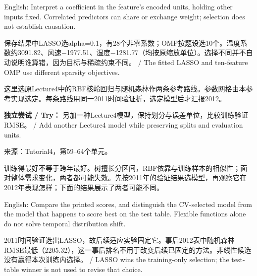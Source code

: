 English: Interpret a coefficient in the feature's encoded units, holding other inputs fixed. Correlated predictors can share or exchange weight; selection does not establish causation.


保存结果中LASSO选alpha=0.1，有28个非零系数；OMP按题设选10个。温度系数约3091.82、风速\ensuremath{-}1977.51、湿度\ensuremath{-}1281.77（均按原缩放单位）。选择不同并不自动说明谁算错，因为目标与稀疏约束不同。 / The fitted LASSO and ten-feature OMP use different sparsity objectives.













这里选原Lecture4中的RBF核岭回归与随机森林作两条参考路线。参数网格由本参考实现选定。每条路线用同一2011时间验证折，选定模型后才汇报2012。


\textbf{独立尝试 / Try：} 另加一种Lecture4模型，保持划分与误差单位，比较训练验证RMSE。 / Add another Lecture4 model while preserving splits and evaluation units.


来源：Tutorial4，第59–64个单元。








训练得最好不等于跨年最好。树擅长分区间，RBF依靠与训练样本的相似性；面对整体需求变化，两者都可能失效。先按2011年的验证结果选模型，再观察它在2012年表现怎样；下面的结果展示了两者可能不同。


English: Compare the printed scores, and distinguish the CV-selected model from the model that happens to score best on the test table. Flexible functions alone do not solve temporal distribution shift.


2011时间验证选出LASSO，故后续适应实验固定它。事后2012表中随机森林RMSE最低（2205.32），这一事后排名不用于改变后续已固定的方法。非线性候选没有赢得本次训练内选择。 / LASSO wins the training-only selection; the test-table winner is not used to revise that choice.




